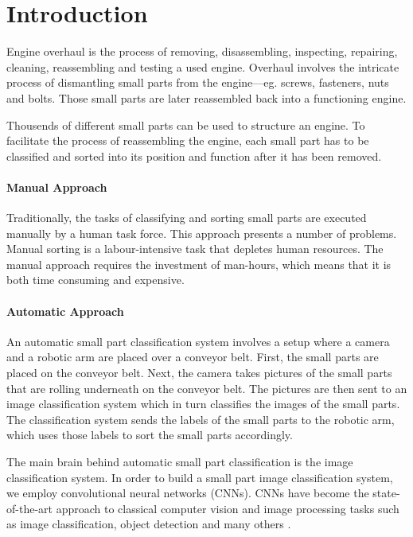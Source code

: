 \chapter{Introduction}\label{ch:introduction}

Engine overhaul is the process of removing, disassembling, inspecting, repairing, cleaning, reassembling and testing a used engine. Overhaul involves the intricate process of dismantling small parts from the engine—eg. screws, fasteners, nuts and bolts. Those small parts are later reassembled back into a functioning engine.

Thousends of different small parts can be used to structure an engine. To facilitate the process of reassembling the engine, each small part has to be classified and sorted into its position and function after it has been removed.

\subsubsection{Manual Approach}

Traditionally, the tasks of classifying and sorting small parts are executed manually by a human task force. This approach presents a number of problems. Manual sorting is a labour-intensive task that depletes human resources. The manual approach requires the investment of man-hours, which means that it is both time consuming and expensive.

\subsubsection{Automatic Approach}

An automatic small part classification system involves a setup where a camera and a robotic arm are placed over a conveyor belt. First, the small parts are placed on the conveyor belt. Next, the camera takes pictures of the small parts that are rolling underneath on the conveyor belt. The pictures are then sent to an image classification system which in turn classifies the images of the small parts. The classification system sends the labels of the small parts to the robotic arm, which uses those labels to sort the small parts accordingly.

The main brain behind automatic small part classification is the image classification system. In order to build a small part image classification system, we employ convolutional neural networks (CNNs). CNNs have become the state-of-the-art approach to classical computer vision and image processing tasks such as image classification, object detection and many others \cite{krizhevsky2012imagenet} \cite{szegedy2015going}.


